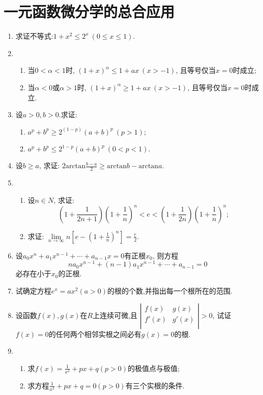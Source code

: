 \section{一元函数微分学的总合应用}
\begin{enumerate}
\item 求证不等式:$1+x^2\le 2^x\ (0\le x \le 1).$
\item 
\begin{enumerate}
	\item 当$0<\alpha<1$时, $(1+x)^\alpha \le 1+ax\ (x>-1)$, 且等号仅当$x=0$时成立;
	\item 当$\alpha<0$或$\alpha >1$时, $(1+x)^\alpha \ge 1+ax\ (x>-1)$, 且等号仅当$x=0$时成立.
\end{enumerate}
\item 设$a>0,b>0$.求证:
\begin{enumerate}
	\item $a^p+b^p \ge 2^{(1-p)}(a+b)^p\ (p>1)$;
	\item $a^p+b^p \le 2^{1-p}(a+b)^p\ (0<p<1).$ 
\end{enumerate}
\item 设$b\ge a$, 求证: $2\mathrm{arctan}\frac{b-a}{2}\ge \mathrm{arctan}b-\mathrm{arctan}a$.	
\item 
\begin{enumerate}
	\item 设$n\in N$, 求证:
	$$(1+\frac{1}{2n+1})(1+\frac{1}{n})^n <e <(1+\frac{1}{2n})(1+\frac{1}{n})^n;
	$$
	\item 求证: $\lim\limits_{n \rightarrow \infty}n[e-(1+\frac{1}{n})^n]=\frac{e}{2}$.
\end{enumerate}
\item 设$a_0x^n+a_1x^{n-1}+\cdots+a_{n-1}x=0$有正根$x_0$, 则方程
$$
na_0x^{n-1}+(n-1)a_1x^{n-1}+\cdots+a_{n-1} = 0
$$必存在小于$x_0$的正根.
\item 试确定方程$e^x=ax^2(a>0)$的根的个数,并指出每一个根所在的范围.
\item 设函数$f(x),g(x)$在$R$上连续可微,且
$\left| \begin{matrix}
	f(x)&		g(x)\\
	f'(x)&		g'(x)\\
\end{matrix} \right|>0$, 试证$f(x)=0$的任何两个相邻实根之间必有$g(x)=0$的根.
\item 
\begin{enumerate}
	\item 求$f(x)=\frac{1}{x^2}+px+q(p>0)$的极值点与极值;
	\item 求方程$\frac{1}{x^2}+px+q=0(p>0)$有三个实根的条件.

\end{enumerate}
\end{enumerate}
